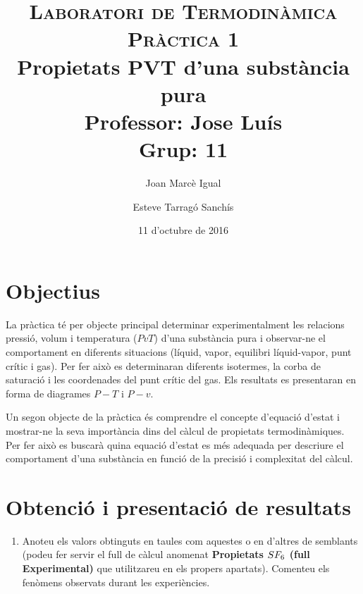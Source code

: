 \documentclass[a4paper]{article}
\title{
	\textsc{Laboratori de Termodinàmica} \\
	\textsc{Pràctica 1} \\
	Propietats PVT d'una substància pura \\
	\large
	Professor: Jose Luís \\ Grup: 11 }
\author{Joan Marcè Igual \and Esteve Tarragó Sanchís}
\date{11 d'octubre de 2016}
\begin{document}
\maketitle

\section*{Objectius}
La pràctica té per objecte principal determinar experimentalment les relacions pressió, volum i temperatura ($PvT$) d'una substància pura i observar-ne el comportament en diferents situacions (líquid, vapor, equilibri líquid-vapor, punt crític i gas). Per fer això es determinaran diferents isotermes, la corba de saturació i les coordenades del punt crític del gas. Els resultats es presentaran en forma de diagrames $P-T$ i $P-v$.

Un segon objecte de la pràctica és comprendre el concepte d’equació d’estat i mostrar-ne la seva importància dins del càlcul de propietats termodinàmiques. Per fer això es buscarà quina equació d’estat es més adequada per descriure el comportament d’una substància en funció de la precisió i complexitat del càlcul.


\section*{Obtenció i presentació de resultats}

\begin{enumerate}
	\item Anoteu els valors obtinguts en taules com aquestes o en d’altres de semblants (podeu fer servir el full de càlcul anomenat \textbf{Propietats $\boldmath SF_6$ (full Experimental)} que utilitzareu en els propers apartats). Comenteu els fenòmens observats durant les experiències.
\end{enumerate}
\end{document}
